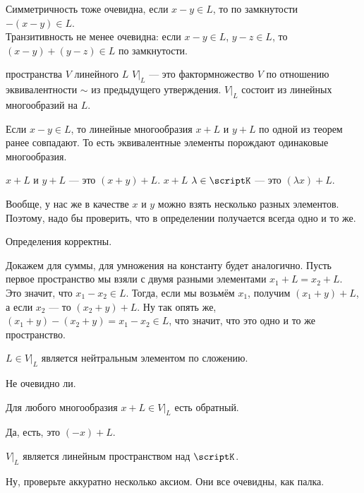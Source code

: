 \documentclass{article}
\begin{document}
\begin{itemize}
\begin{Proof}
            Симметричность тоже очевидна, если $x-y\in L$, то по замкнутости $-(x-y)\in L$.\\
            Транзитивность не менее очевидна: если $x-y\in L$, $y-z\in L$, то $(x-y)+(y-z)\in L$ по замкнутости.
        \end{Proof}
        \dfn {} пространства $V$  линейного  $L$ $V\big|_L$ --- это фактормножество $V$ по отношению эквивалентности $\sim$ из предыдущего утверждения.
        \thm $V\big|_L$ состоит из линейных многообразий на $L$.
        \begin{Proof}
            Если $x-y\in L$, то линейные многообразия $x+L$ и $y+L$ по одной из теорем ранее совпадают. То есть эквивалентные элементы порождают одинаковые многообразия.
        \end{Proof}
        \dfn {} $x+L$ и $y+L$ --- это $(x+y)+L$.
        \dfn {} $x+L$  $\lambda\in\scriptK$ --- это $(\lambda x)+L$.
        \begin{Comment}
            Вообще, у нас же в качестве $x$ и $y$ можно взять несколько разных элементов. Поэтому, надо бы проверить, что в определении получается всегда одно и то же.
        \end{Comment}
        \thm Определения корректны.
        \begin{Proof}
            Докажем для суммы, для умножения на константу будет аналогично. Пусть первое пространство мы взяли с двумя разными элементами $x_1+L=x_2+L$. Это значит, что $x_1-x_2\in L$. Тогда, если мы возьмём $x_1$, получим $(x_1+y)+L$, а если $x_2$ --- то $(x_2+y)+L$. Ну так опять же, $(x_1+y)-(x_2+y)=x_1-x_2\in L$, что значит, что это одно и то же пространство.
        \end{Proof}
        \thm $L\in V\big|_L$ является нейтральным элементом по сложению.
        \begin{Proof}
            Не очевидно ли.
        \end{Proof}
        \thm Для любого многообразия $x+L\in V\big|_L$ есть обратный.
        \begin{Proof}
            Да, есть, это $(-x)+L$.
        \end{Proof}
        \thm $V\big|_L$ является линейным пространством над $\scriptK$.
        \begin{Proof}
            Ну, проверьте аккуратно несколько аксиом. Они все очевидны, как палка.

\end{Proof}
\end{itemize}
\end{document}
